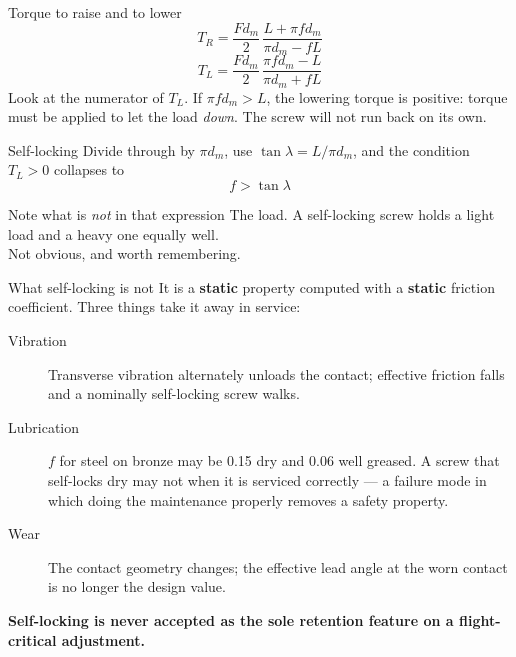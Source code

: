 \documentclass[aspectratio=169,10pt]{beamer}
\begin{document}
\begin{frame}{Torque to raise and to lower}
\[\boxed{\;T_R = \frac{F d_m}{2}\,\frac{L + \pi f d_m}{\pi d_m - f L}\;}\]
\vfill
\[\boxed{\;T_L = \frac{F d_m}{2}\,\frac{\pi f d_m - L}{\pi d_m + f L}\;}\]
\vfill
Look at the numerator of $T_L$.
\vfill
If $\pi f d_m > L$, the lowering torque is \alert{positive}: torque must be applied to let the load
\emph{down}. The screw will not run back on its own.
\end{frame}

\begin{frame}{Self-locking}
Divide through by $\pi d_m$, use $\tan\lambda = L/\pi d_m$, and the condition $T_L>0$ collapses to
\vfill
\[\boxed{\ f > \tan\lambda\ }\]
\vfill
\begin{alertblock}{Note what is \emph{not} in that expression}
The load. A self-locking screw holds a light load and a heavy one equally well.\\[5pt]
Not obvious, and worth remembering.
\end{alertblock}
\end{frame}

\begin{frame}{What self-locking is not}
It is a \textbf{static} property computed with a \textbf{static} friction coefficient. Three things take
it away in service:
\vfill
\begin{description}
  \item[Vibration] Transverse vibration alternately unloads the contact; effective friction falls and a
    nominally self-locking screw walks.
  \item[Lubrication] $f$ for steel on bronze may be 0.15 dry and 0.06 well greased. \alert{A screw that
    self-locks dry may not when it is serviced correctly} --- a failure mode in which doing the
    maintenance properly removes a safety property.
  \item[Wear] The contact geometry changes; the effective lead angle at the worn contact is no longer
    the design value.
\end{description}
\vfill
\centering\textbf{Self-locking is never accepted as the sole retention feature on a flight-critical adjustment.}
\end{frame}
\end{document}
